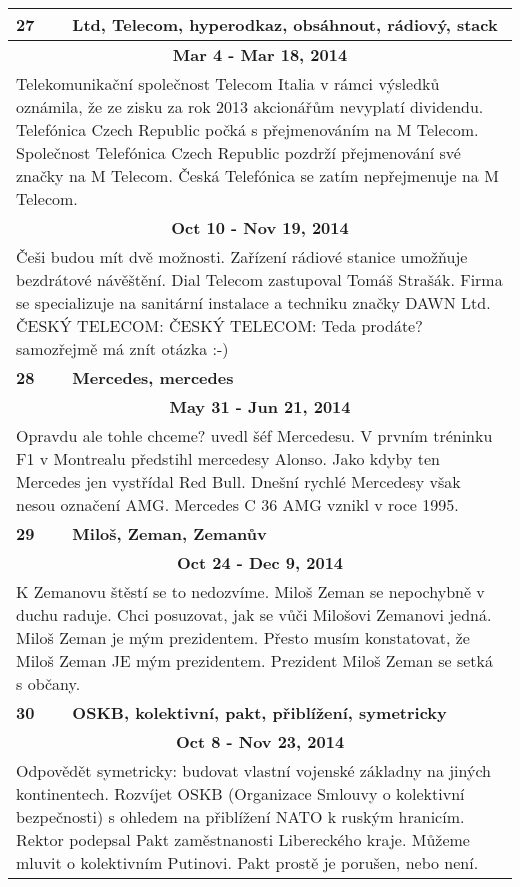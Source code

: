 \begin{tabularx}{\linewidth}{l l}
\bf 27 & \bf Ltd, Telecom, hyperodkaz, obsáhnout, rádiový, stack \\ \midrule
\multicolumn{2}{c}{\bf Mar 4 - Mar 18, 2014} \\
\multicolumn{2}{p{\linewidth}}{Telekomunikační společnost Telecom Italia v rámci výsledků oznámila, že ze zisku za rok 2013 akcionářům nevyplatí dividendu. Telefónica Czech Republic počká s přejmenováním na M Telecom. Společnost Telefónica Czech Republic pozdrží přejmenování své značky na M Telecom. Česká Telefónica se zatím nepřejmenuje na M Telecom.} \\ \midrule
\multicolumn{2}{c}{\bf Oct 10 - Nov 19, 2014} \\
\multicolumn{2}{p{\linewidth}}{Češi budou mít dvě možnosti. Zařízení rádiové stanice umožňuje bezdrátové návěštění. Dial Telecom zastupoval Tomáš Strašák. Firma se specializuje na sanitární instalace a techniku značky DAWN Ltd. ČESKÝ TELECOM: ČESKÝ TELECOM: Teda prodáte? samozřejmě má znít otázka :-)} \\ \midrule[1.5pt]

\bf 28 & \bf Mercedes, mercedes \\ \midrule
\multicolumn{2}{c}{\bf May 31 - Jun 21, 2014} \\
\multicolumn{2}{p{\linewidth}}{Opravdu ale tohle chceme? uvedl šéf Mercedesu. V prvním tréninku F1 v Montrealu předstihl mercedesy Alonso. Jako kdyby ten Mercedes jen vystřídal Red Bull. Dnešní rychlé Mercedesy však nesou označení AMG. Mercedes C 36 AMG vznikl v roce 1995.} \\ \midrule[1.5pt]

\bf 29 & \bf Miloš, Zeman, Zemanův \\ \midrule
\multicolumn{2}{c}{\bf Oct 24 - Dec 9, 2014} \\
\multicolumn{2}{p{\linewidth}}{K Zemanovu štěstí se to nedozvíme. Miloš Zeman se nepochybně v duchu raduje. Chci posuzovat, jak se vůči Milošovi Zemanovi jedná. Miloš Zeman je mým prezidentem. Přesto musím konstatovat, že Miloš Zeman JE mým prezidentem. Prezident Miloš Zeman se setká s občany.} \\ \midrule[1.5pt]

\bf 30 & \bf OSKB, kolektivní, pakt, přiblížení, symetricky \\ \midrule
\multicolumn{2}{c}{\bf Oct 8 - Nov 23, 2014} \\
\multicolumn{2}{p{\linewidth}}{Odpovědět symetricky: budovat vlastní vojenské základny na jiných kontinentech. Rozvíjet OSKB (Organizace Smlouvy o kolektivní bezpečnosti) s ohledem na přiblížení NATO k ruským hranicím. Rektor podepsal Pakt zaměstnanosti Libereckého kraje. Můžeme mluvit o kolektivním Putinovi. Pakt prostě je porušen, nebo není.} \\ \midrule[1.5pt]


\end{tabularx}
